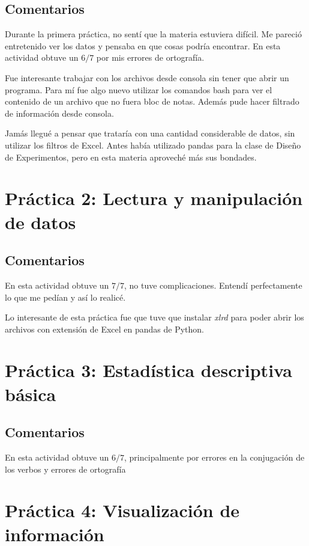 \documentclass[12pt, letter]{report}
\begin{document}
\section*{Comentarios}
Durante la primera práctica, no sentí que la materia estuviera difícil. Me pareció entretenido ver los datos y pensaba en que cosas podría encontrar. En esta actividad obtuve un $6/7$ por mis errores de ortografía.

Fue interesante trabajar con los archivos desde consola sin tener que abrir un programa. Para mí fue algo nuevo utilizar los comandos bash para ver el contenido de un archivo que no fuera bloc de notas. Además pude hacer filtrado de información desde consola.

Jamás llegué a pensar que trataría con una cantidad considerable de datos, sin utilizar los filtros de Excel. Antes había utilizado pandas para la clase de Diseño de Experimentos, pero en esta materia aproveché más sus bondades.



\chapter*{Práctica 2: Lectura y manipulación de datos}

\section*{Comentarios}
En esta actividad obtuve un $7/7$, no tuve complicaciones. Entendí perfectamente lo que me pedían y así lo realicé.

Lo interesante de esta práctica fue que tuve que instalar \textit{xlrd} para poder abrir los archivos con extensión de Excel en pandas de Python.


\chapter*{Práctica 3: Estadística descriptiva básica}

\section*{Comentarios}
En esta actividad obtuve un $6/7$, principalmente por errores en la conjugación de los verbos y errores de ortografía


\chapter*{Práctica 4: Visualización de información}

\end{document}

